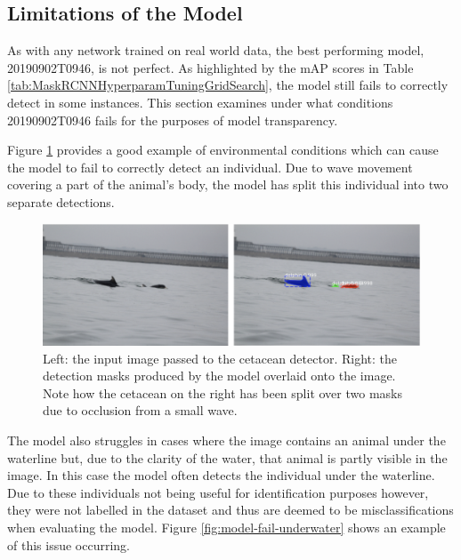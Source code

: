 \subsection{Limitations of the Model}\label{ch:cetDet,sec:ModelSelection,sub:LimitationsOfBest}

As with any network trained on real world data, the best performing model, 20190902T0946, is not perfect. As highlighted by the mAP scores in Table \ref{tab:MaskRCNNHyperparamTuningGridSearch}, the model still fails to correctly detect in some instances. This section examines under what conditions 20190902T0946 fails for the purposes of model transparency. 

Figure \ref{fig:model-fail-bad-detection-and-split-individual} provides a good example of environmental conditions which can cause the model to fail to correctly detect an individual. Due to wave movement covering a part of the animal's body, the model has split this individual into two separate detections.

\begin{figure}[h]
	\begin{center}
		\includegraphics[scale=0.6]{Chapter3/figs/model-fail-split-individual.png}
	\end{center}
	\caption[Left: the input image passed to the cetacean detector. Right: the detection masks produced by the model overlaid onto the image.]{Left: the input image passed to the cetacean detector. Right: the detection masks produced by the model overlaid onto the image. Note how the cetacean on the right has been split over two masks due to occlusion from a small wave.}
	\label{fig:model-fail-bad-detection-and-split-individual}
\end{figure}
 
The model also struggles in cases where the image contains an animal under the waterline but, due to the clarity of the water, that animal is partly visible in the image. In this case the model often detects the individual under the waterline. Due to these individuals not being useful for identification purposes however, they were not labelled in the dataset and thus are deemed to be misclassifications when evaluating the model. Figure \ref{fig:model-fail-underwater} shows an example of this issue occurring.

